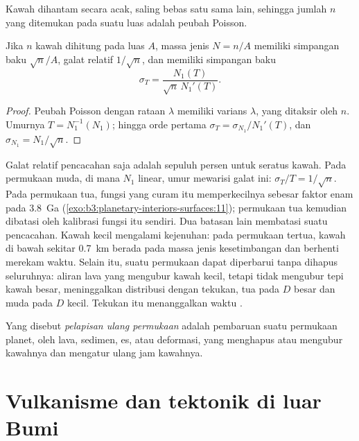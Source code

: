 Kawah dihantam secara acak, saling bebas satu sama lain, sehingga jumlah
$n$ yang ditemukan pada suatu luas adalah peubah Poisson.

\begin{proposition}\label{prop:b3:planetary-interiors-surfaces:poisson}
Jika $n$ kawah dihitung pada luas $A$, massa jenis $N = n/A$ memiliki
simpangan baku $\sqrt n/A$, galat relatif $1/\sqrt n$, dan 
memiliki simpangan baku
\[
  \sigma_T = \frac{N_1(T)}{\sqrt n\,N_1'(T)} .
\]
\end{proposition}

\begin{proof}
Peubah Poisson dengan rataan $\lambda$ memiliki varians $\lambda$, yang ditaksir oleh
$n$. Umurnya $T = N_1^{-1}(N_1)$; hingga orde pertama $\sigma_T =
\sigma_{N_1}/N_1'(T)$, dan $\sigma_{N_1} = N_1/\sqrt n$.
\end{proof}

Galat relatif pencacahan saja adalah sepuluh persen untuk seratus
kawah. Pada permukaan muda, di mana $N_1$ linear, umur mewarisi galat ini:
$\sigma_T/T = 1/\sqrt n$. Pada permukaan tua, fungsi yang curam itu memperkecilnya sebesar
faktor enam pada \qty{3.8}{Ga} (\cref{exo:b3:planetary-interiors-surfaces:11});
 permukaan tua kemudian dibatasi oleh kalibrasi
fungsi itu sendiri. Dua batasan lain membatasi suatu pencacahan. Kawah kecil
mengalami kejenuhan: pada permukaan tertua, kawah di bawah sekitar \qty{0.7}{km} berada pada
massa jenis kesetimbangan dan berhenti merekam waktu. Selain itu, suatu permukaan dapat diperbarui
tanpa dihapus seluruhnya: aliran lava yang mengubur kawah kecil, tetapi tidak
mengubur tepi kawah besar, meninggalkan distribusi dengan tekukan, tua pada $D$ besar dan
muda pada $D$ kecil. Tekukan itu menanggalkan waktu .

\begin{definition}\label{def:b3:planetary-interiors-surfaces:resurfacing}
Yang disebut \emph{pelapisan ulang permukaan} adalah pembaruan suatu
permukaan planet, oleh lava, sedimen, es, atau deformasi, yang menghapus atau mengubur
kawahnya dan mengatur ulang jam kawahnya.
\end{definition}

\section{Vulkanisme dan tektonik di luar Bumi}\label{sec:b3:planetary-interiors-surfaces:volcanism}

